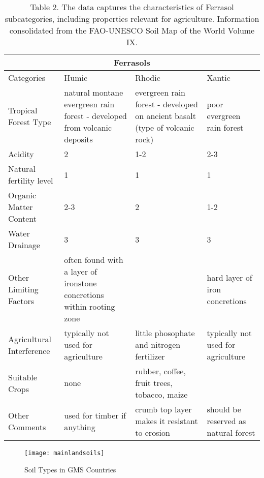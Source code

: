 \begin{table}
\begin{center}   
    \begin{tabular}{ | p{5cm} | p{3cm} | p{3cm} | p{3cm} |}
    \hline
    \multicolumn{4}{|c|}{Ferrasols} \\
    \hline
    Categories & Humic & Rhodic & Xantic \\ \hline
    Tropical Forest Type & natural montane evergreen rain forest - developed from volcanic deposits & evergreen rain forest - developed on ancient basalt (type of volcanic rock) & poor evergreen rain forest\\ \hline
    Acidity & 2 & 1-2 & 2-3 \\ \hline
    Natural fertility level & 1 & 1 & 1 \\ \hline
    Organic Matter Content & 2-3 & 2 & 1-2 \\ \hline
    Water Drainage & 3 & 3 & 3 \\ \hline
    Other Limiting Factors & often found with a layer of ironstone concretions within rooting zone & & hard layer of iron concretions\\ \hline
    Agricultural Interference & typically not used for agriculture & little phosophate and nitrogen fertilizer & typically not used for agriculture\\ \hline
    Suitable Crops & none & rubber, coffee, fruit trees, tobacco, maize & \\ \hline
    Other Comments & used for timber if anything & crumb top layer makes it resistant to erosion & should be reserved as natural forest\\ 
    \hline
    \end{tabular}
    \caption{Table 2. The data captures the characteristics of Ferrasol subcategories, including properties relevant for agriculture. Information consolidated from the FAO-UNESCO Soil Map of the World Volume IX.}
\end{center}
\end{table}

\begin{figure}
\texttt{[image: mainlandsoils]}
\caption{Soil Types in GMS Countries}
\label{fig:mainlandsoils}
\end{figure}

